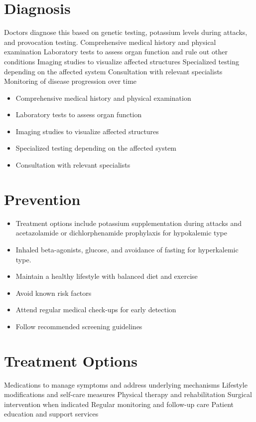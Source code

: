 \section{Diagnosis}
Doctors diagnose this based on genetic testing, potassium levels during attacks, and provocation testing. Comprehensive medical history and physical examination Laboratory tests to assess organ function and rule out other conditions Imaging studies to visualize affected structures Specialized testing depending on the affected system Consultation with relevant specialists Monitoring of disease progression over time

\begin{itemize}[noitemsep]
  \item Comprehensive medical history and physical examination
  \item Laboratory tests to assess organ function
  \item Imaging studies to visualize affected structures
  \item Specialized testing depending on the affected system
  \item Consultation with relevant specialists
\end{itemize}
\section{Prevention}
\begin{itemize}[noitemsep]
  \item Treatment options include potassium supplementation during attacks and acetazolamide or dichlorphenamide prophylaxis for hypokalemic type
  \item Inhaled beta-agonists, glucose, and avoidance of fasting for hyperkalemic type.
  \item Maintain a healthy lifestyle with balanced diet and exercise
  \item Avoid known risk factors
  \item Attend regular medical check-ups for early detection
  \item Follow recommended screening guidelines
\end{itemize}
\section{Treatment Options}
Medications to manage symptoms and address underlying mechanisms Lifestyle modifications and self-care measures Physical therapy and rehabilitation Surgical intervention when indicated Regular monitoring and follow-up care Patient education and support services

